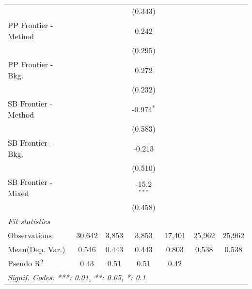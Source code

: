 \begin{tabular}{lcccccc}
                        &               &              & (0.343)       &               &        &   \\   
   PP Frontier - Method &               &              & 0.242         &               &        &   \\   
                        &               &              & (0.295)       &               &        &   \\   
   PP Frontier - Bkg.   &               &              & 0.272         &               &        &   \\   
                        &               &              & (0.232)       &               &        &   \\   
   SB Frontier - Method &               &              & -0.974$^{*}$  &               &        &   \\   
                        &               &              & (0.583)       &               &        &   \\   
   SB Frontier - Bkg.   &               &              & -0.213        &               &        &   \\   
                        &               &              & (0.510)       &               &        &   \\   
   SB Frontier - Mixed  &               &              & -15.2$^{***}$ &               &        &   \\   
                        &               &              & (0.458)       &               &        &   \\   
   \midrule
   \emph{Fit statistics}\\
   Observations         & 30,642        & 3,853        & 3,853         & 17,401        & 25,962 & 25,962\\  
Mean(Dep. Var.) & 0.546 & 0.443 & 0.443 & 0.803 & 0.538 & 0.538 \\
   Pseudo R$^2$         & 0.43          & 0.51         & 0.51          & 0.42          &        & \\  
   \midrule \midrule
   \multicolumn{7}{l}{\emph{Signif. Codes: ***: 0.01, **: 0.05, *: 0.1}}\\
\end{tabular}
\par\endgroup
